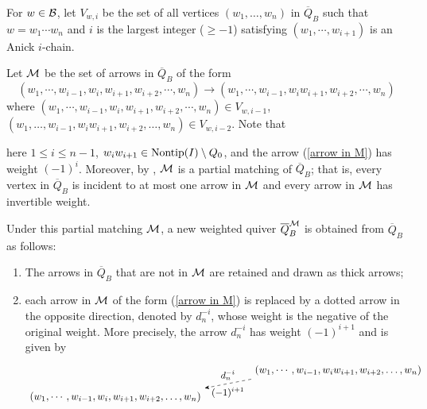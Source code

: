\documentclass[10pt, reqno]{amsart}
\theoremstyle{definition}
\theoremstyle{remark}
\numberwithin{equation}{section}
\begin{document}
For \(w \in \mathcal{B}\), let \(V_{w,i}\) be the set of all vertices \((w_1, \dots, w_n)\) in \(\overline{Q}_B\) such that \(w = w_1 \cdots w_n\) and \(i\) is the largest integer (\(\ge-1\)) satisfying \((w_1, \cdots, w_{i+1})\) is an Anick \(i\)-chain. 

Let \(\mathcal{M}\) be the set of arrows in \(\overline{Q}_B\) of the form
\begin{equation} \label{arrow in M}
    (w_1, \cdots, w_{i-1}, w_i, w_{i+1}, w_{i+2}, \cdots, w_n) \to (w_1, \cdots, w_{i-1}, w_i w_{i+1}, w_{i+2}, \cdots, w_n)
\end{equation}
where \((w_1, \cdots, w_{i-1}, w_i, w_{i+1}, w_{i+2}, \cdots, w_n) \in V_{w,i-1}\), \((w_1, \dots, w_{i-1}, w_i w_{i+1}, w_{i+2}, \dots, w_n) \in V_{w,i-2}\). Note that 

\noindent here \(1\le i\le n-1\), \(w_i w_{i+1} \in \mathrm{Nontip}(I) \setminus Q_0\), and the arrow (\ref{arrow in M}) has weight \((-1)^i\).
Moreover, by \cite[Page 15]{CLZ24}, \(\mathcal{M}\) is a partial matching of \(\overline{Q}_B\); that is, every vertex in \(\overline{Q}_B\) is incident to at most one arrow in \(\mathcal{M}\) and every arrow in \(\mathcal{M}\) has invertible weight.

Under this partial matching \(\mathcal{M}\), a new weighted quiver \(\overline{Q}_B^{\mathcal{M}}\)  is obtained from \(\overline{Q}_B\) as follows:
\begin{enumerate}
    \item[(1)] The arrows in \(\overline{Q}_B\) that are not in \(\mathcal{M}\) are retained and drawn as thick arrows;
    \item[(2)] each arrow in \(\mathcal{M}\) of the form (\ref{arrow in M}) 
    is replaced by a dotted arrow  in the opposite direction, denoted by \(d_n^{-i}\), whose weight is the negative of the original weight. More precisely, the arrow \(d_n^{-i}\) has weight \((-1)^{i+1}\) and is given by 
\[
\begin{tikzpicture}[>=Stealth, baseline=(current bounding box.center)]
    \node (top) at (0, 0.4)  {$(w_1, \cdots, w_{i-1}, w_i w_{i+1}, w_{i+2}, \dots, w_n)$};
    \node (bot) at (-7.5, -0.5) {$(w_1, \cdots, w_{i-1}, w_i, w_{i+1}, w_{i+2}, \dots, w_n)$};
    
    \draw[->, dashed] (top.south west) -- (bot.north east) 
        node[midway, above, font=\small, yshift=0pt] {$d_n^{-i}$}
        node[midway, below, font=\small, yshift=-0pt] {$(-1)^{i+1}$};
\end{tikzpicture}
\]
\end{enumerate}
\end{document}
